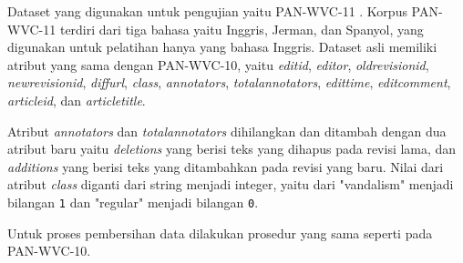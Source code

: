Dataset yang digunakan untuk pengujian yaitu PAN-WVC-11
\cite{potthast:2010b}.
Korpus PAN-WVC-11 terdiri dari tiga bahasa yaitu Inggris, Jerman, dan
Spanyol, yang digunakan untuk pelatihan hanya yang bahasa Inggris.
Dataset asli memiliki atribut yang sama dengan PAN-WVC-10, yaitu
\textit{editid},
\textit{editor},
\textit{oldrevisionid},
\textit{newrevisionid},
\textit{diffurl},
\textit{class},
\textit{annotators},
\textit{totalannotators},
\textit{edittime},
\textit{editcomment},
\textit{articleid}, dan
\textit{articletitle}.

Atribut \textit{annotators} dan \textit{totalannotators} dihilangkan dan
ditambah dengan dua atribut baru yaitu \textit{deletions} yang berisi teks yang
dihapus pada revisi lama, dan \textit{additions} yang berisi teks yang
ditambahkan pada revisi yang baru.
Nilai dari atribut \textit{class} diganti dari string menjadi integer, yaitu
dari "vandalism" menjadi bilangan \texttt{1}
dan "regular" menjadi bilangan \texttt{0}.

Untuk proses pembersihan data dilakukan prosedur yang sama seperti pada
PAN-WVC-10.
